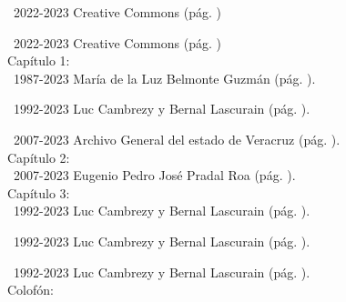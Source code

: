 \documentclass[14pt,twoside,final]{extbook} %
\begin{document}
\noindent\textcopyright\ 2022-2023 Creative Commons (pág. \pageref{fig:cc-large})

\noindent\textcopyright\ 2022-2023 Creative Commons (pág. \pageref{fig:cc-large}) \\

\noindent Capítulo 1: \\

\noindent\textcopyright\ 1987-2023 María de la Luz Belmonte Guzmán (pág. \pageref{fig:veracruz-1857}).

\noindent\textcopyright\ 1992-2023 Luc Cambrezy y Bernal Lascurain (pág. \pageref{fig:jalacingo-principios-xx}).

\noindent\textcopyright\ 2007-2023 Archivo General del estado de Veracruz (pág. \pageref{fig:progreso-industrial}). \\

\noindent Capítulo 2: \\

\noindent\textcopyright\ 2007-2023 Eugenio Pedro José Pradal Roa (pág. \pageref{fig:jalacingo-photo}). \\

\noindent Capítulo 3: \\

\noindent\textcopyright\ 1992-2023 Luc Cambrezy y Bernal Lascurain (pág. \pageref{fig:hda-limon}).

\noindent\textcopyright\ 1992-2023 Luc Cambrezy y Bernal Lascurain (pág. \pageref{fig:hda-cuatotolapam}).

\noindent\textcopyright\ 1992-2023 Luc Cambrezy y Bernal Lascurain (pág. \pageref{fig:hda-tenextepec}). \\

\noindent Colofón: \\
\end{document}
